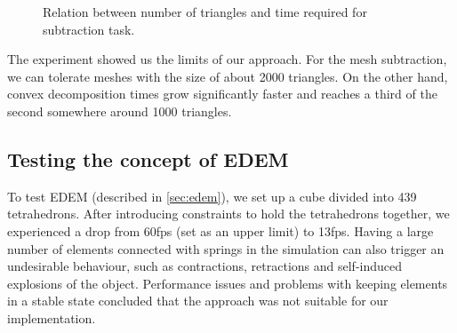 \begin{figure}
\centering
{}
\caption{Relation between number of triangles and time required for subtraction task.}
\label{fig:triangletimes}
\end{figure}




The experiment showed us the limits of our approach. For the mesh subtraction, we can tolerate meshes with the size of about 2000 triangles.  On the other hand, convex decomposition times grow significantly faster and reaches a third of the second somewhere around 1000 triangles.


\subsection{Testing the concept of EDEM}
To test EDEM (described in \cref{sec:edem}), we set up a cube divided into 439 tetrahedrons. After introducing constraints to hold the tetrahedrons together, we experienced a drop from 60fps (set as an upper limit) to 13fps. Having a large number of elements connected with springs in the simulation can also trigger an undesirable behaviour, such as contractions, retractions and self-induced explosions of the object. Performance issues and problems with keeping elements in a stable state concluded that the approach was not suitable for our implementation.




